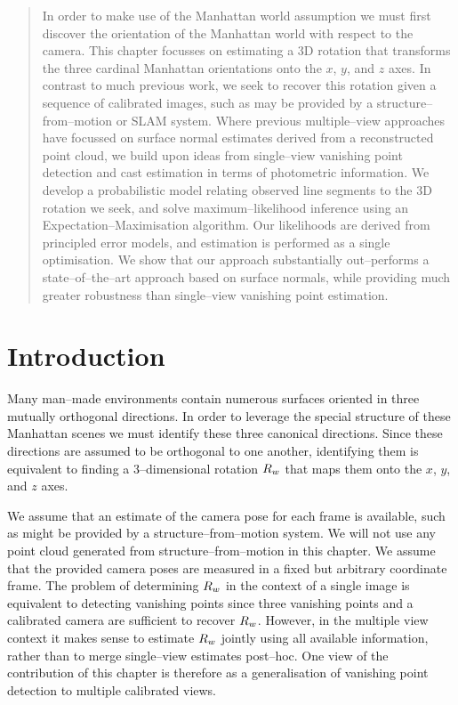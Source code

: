 \begin{quote}
  In order to make use of the Manhattan world assumption we must first
  discover the orientation of the Manhattan world with respect to the
  camera. This chapter focusses on estimating a 3D rotation that
  transforms the three cardinal Manhattan orientations onto the $x$,
  $y$, and $z$ axes. In contrast to much previous work, we seek to
  recover this rotation given a sequence of calibrated images, such as
  may be provided by a structure--from--motion or SLAM system. Where
  previous multiple--view approaches have focussed on surface normal
  estimates derived from a reconstructed point cloud, we build upon
  ideas from single--view vanishing point detection and cast
  estimation in terms of photometric information. We develop a
  probabilistic model relating observed line segments to the 3D
  rotation we seek, and solve maximum--likelihood inference using an
  Expectation--Maximisation algorithm. Our likelihoods are derived
  from principled error models, and estimation is performed as a
  single optimisation.  We show that our approach substantially
  out--performs a state--of--the--art approach based on surface
  normals, while providing much greater robustness than single--view
  vanishing point estimation.\footnotemark
\end{quote}


\section{Introduction}

Many man--made environments contain numerous surfaces oriented in
three mutually orthogonal directions. In order to leverage the special
structure of these Manhattan scenes we must identify these three
canonical directions. Since these directions are assumed to be
orthogonal to one another, identifying them is equivalent to finding a
3--dimensional rotation $\SceneR$ that maps them onto the $x$, $y$,
and $z$ axes.

We assume that an estimate of the camera pose for each frame is
available, such as might be provided by a structure--from--motion
system. We will not use any point cloud generated from
structure--from--motion in this chapter. We assume that the provided
camera poses are measured in a fixed but arbitrary coordinate
frame. The problem of determining $\SceneR$ in the context of a single
image is equivalent to detecting vanishing points since three
vanishing points and a calibrated camera are sufficient to recover
$\SceneR$. However, in the multiple view context it makes sense to
estimate $\SceneR$ jointly using all available information, rather
than to merge single--view estimates post--hoc. One view of the
contribution of this chapter is therefore as a generalisation of
vanishing point detection to multiple calibrated views.

